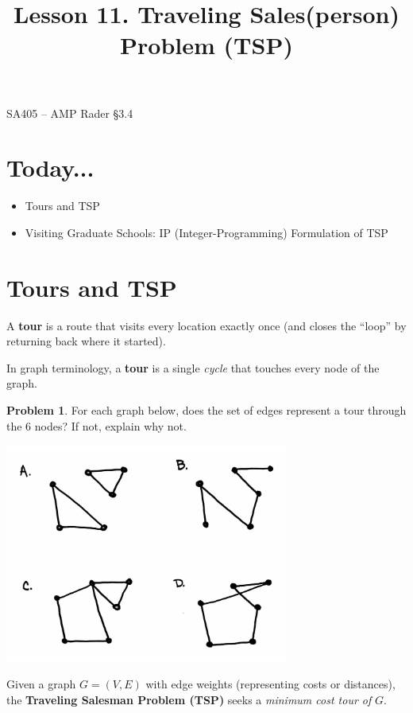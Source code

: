 \documentclass[11pt]{article}
\makeatletter
\theoremstyle{definition}
\newtheorem{problem}{Problem}
\renewcommand{\maketitle}{
  \noindent SA405 -- AMP \hfill Rader \S 3.4 \\

  \begin{center}\Large{\textbf{\@title}}\end{center}
}
\makeatother
\begin{document}
  
\title{Lesson 11.  Traveling Sales(person) Problem (TSP)}

\maketitle

\section{Today...}

\begin{itemize}
	\item  Tours and TSP
	\item  Visiting Graduate Schools: IP (Integer-Programming) Formulation of TSP
\end{itemize}

\section{Tours and TSP}

\begin{tcolorbox}
A \textbf{tour} is a route that visits every location exactly once (and closes the ``loop'' by returning back where it started).

\smallskip
In graph terminology, a \textbf{tour} is a single \emph{cycle} that touches every node of the graph.
\end{tcolorbox}

\begin{problem}
For each graph below, does the set of edges represent a tour through the 6 nodes?  If not, explain why not.

\includegraphics[width=0.7\textwidth]{tours}
\end{problem}

\begin{tcolorbox}
Given a graph $G = (V, E)$ with edge weights (representing costs or distances), the \textbf{Traveling Salesman Problem (TSP)} seeks a \emph{minimum cost tour of} $G$.
\end{tcolorbox}
\end{document}
